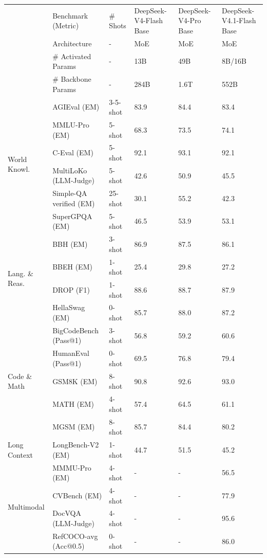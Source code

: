 \documentclass[
  10
]{article}
\newcounter{none} %
\begin{document}
{\def\LTcaptype{none} %
\begin{longtable}[]{@{}llllll@{}}
\toprule\noalign{}
\endhead
\bottomrule\noalign{}
\endlastfoot
& Benchmark (Metric) & \# Shots & DeepSeek-V4-Flash Base &
DeepSeek-V4-Pro Base & DeepSeek-V4.1-Flash Base \\
\multirow{3}{*}{} & Architecture & - & MoE & MoE & MoE \\
& \# Activated Params & - & 13B & 49B & 8B/16B \\
& \# Backbone Params & - & 284B & 1.6T & 552B \\
\multirow{6}{*}{World Knowl.} & AGIEval (EM) & 3-5-shot & 83.9 & 84.4 &
83.4 \\
& MMLU-Pro (EM) & 5-shot & 68.3 & 73.5 & 74.1 \\
& C-Eval (EM) & 5-shot & 92.1 & 93.1 & 92.1 \\
& MultiLoKo (LLM-Judge) & 5-shot & 42.6 & 50.9 & 45.5 \\
& Simple-QA verified (EM) & 25-shot & 30.1 & 55.2 & 42.3 \\
& SuperGPQA (EM) & 5-shot & 46.5 & 53.9 & 53.1 \\
\multirow{4}{*}{Lang. \& Reas.} & BBH (EM) & 3-shot & 86.9 & 87.5 &
86.1 \\
& BBEH (EM) & 1-shot & 25.4 & 29.8 & 27.2 \\
& DROP (F1) & 1-shot & 88.6 & 88.7 & 87.9 \\
& HellaSwag (EM) & 0-shot & 85.7 & 88.0 & 87.2 \\
\multirow{5}{*}{Code \& Math} & BigCodeBench (Pass@1) & 3-shot & 56.8 &
59.2 & 60.6 \\
& HumanEval (Pass@1) & 0-shot & 69.5 & 76.8 & 79.4 \\
& GSM8K (EM) & 8-shot & 90.8 & 92.6 & 93.0 \\
& MATH (EM) & 4-shot & 57.4 & 64.5 & 61.1 \\
& MGSM (EM) & 8-shot & 85.7 & 84.4 & 80.2 \\
Long Context & LongBench-V2 (EM) & 1-shot & 44.7 & 51.5 & 45.2 \\
\multirow{4}{*}{Multimodal} & MMMU-Pro (EM) & 4-shot & - & - & 56.5 \\
& CVBench (EM) & 4-shot & - & - & 77.9 \\
& DocVQA (LLM-Judge) & 4-shot & - & - & 95.6 \\
& RefCOCO-avg (Acc@0.5) & 0-shot & - & - & 86.0 \\
\end{longtable}
}
\end{document}
